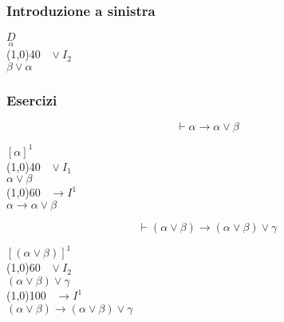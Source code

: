 \documentclass{article}
\theoremstyle{break}
\theoremstyle{break}
\theoremstyle{break}
\theoremstyle{break}
\begin{document}
\subsubsection{Introduzione a sinistra}
\begin{center}
  \( \underset{\alpha}{D} \) \\
  \hspace{0.9cm}\line(1,0){40}\(\;\;\; \vee I_2 \)\\  
  \( \beta \vee \alpha \)
\end{center}


\subsubsection{Esercizi}
\begin{exercise}
  \[
    \vdash \alpha \to \alpha \vee \beta
  \] 
  \begin{center}
    \( [\alpha]^1 \)\\
    \hspace{0.9cm}\line(1,0){40}\(\;\;\; \vee I_1 \)\\  
    \( \alpha \vee \beta \) \\
    \hspace{1cm}\line(1,0){60}\(\;\;\; \to I^1 \)\\  
    \( \alpha \to \alpha \vee \beta \) 
  \end{center}
\end{exercise}

\begin{exercise}[a casa]
  \[
    \vdash (\alpha \vee \beta) \to (\alpha \vee \beta) \vee \gamma
  \] 
  \begin{center}
    \( [(\alpha \vee \beta)]^1 \) \\
    \hspace{0.7cm}\line(1,0){60}\(\;\;\; \vee I_2  \)\\
    \( (\alpha \vee \beta) \vee \gamma \) \\
    \hspace{1cm}\line(1,0){100}\(\;\;\; \to I^1  \)\\
    \( (\alpha \vee \beta) \to (\alpha \vee \beta) \vee \gamma \) 
  \end{center}
\end{exercise}
\end{document}
